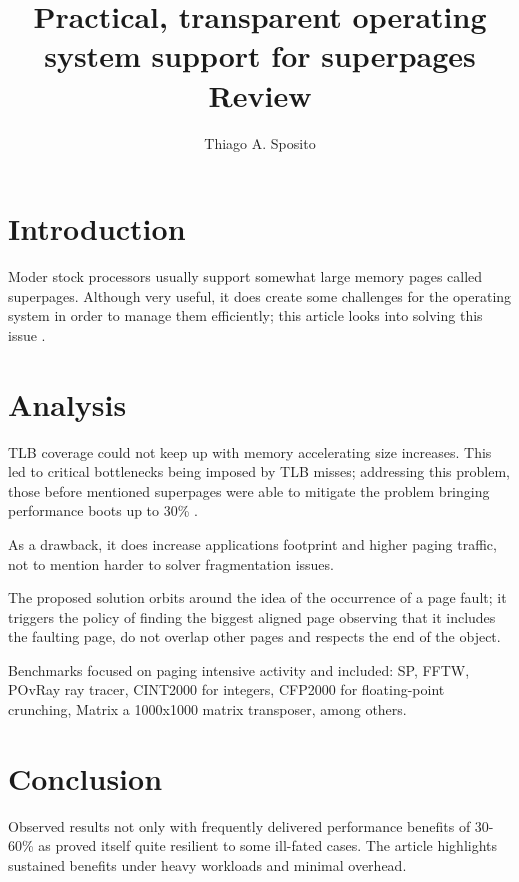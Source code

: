 \documentclass[12pt]{article}
\title{Practical, transparent operating system support for superpages Review}
\author{Thiago A. Sposito\inst{1} }
\begin{document}
 

\maketitle


\section{Introduction}
Moder stock processors usually support somewhat large memory pages called superpages. Although very useful, it does create some challenges for the operating system in order to manage them efficiently; this article looks into solving this issue \cite{navarro2002practical}.
\section{Analysis}
TLB coverage could not keep up with memory accelerating size increases. This led to critical bottlenecks being imposed by TLB misses; addressing this problem, those before mentioned superpages were able to mitigate the problem bringing performance boots up to 30\% \cite{kandiraju2002characterizing}.

As a drawback, it does increase applications footprint and higher paging traffic, not to mention harder to solver fragmentation issues.

The proposed solution orbits around the idea of the occurrence of a page fault; it triggers the policy of finding the biggest aligned page observing that it includes the faulting page, do not overlap other pages and respects the end of the object.

Benchmarks focused on paging intensive activity and included: SP, FFTW, POvRay ray tracer, CINT2000 for integers, CFP2000 for floating-point crunching, Matrix a 1000x1000 matrix transposer, among others.

\section{Conclusion}
Observed results not only with frequently delivered performance benefits of 30-60\% as proved itself quite resilient to some ill-fated cases. The article highlights sustained benefits under heavy workloads and minimal overhead. 


\end{document}
